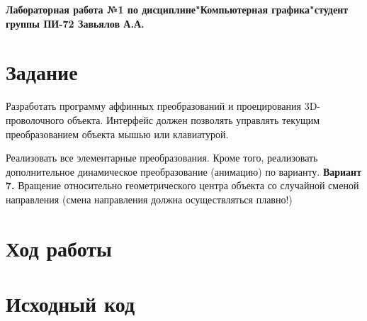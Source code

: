 \documentclass[a4paper,12pt]{article}
\begin{document}

\begin{center}
  \textbf{Лабораторная работа №1 по дисциплине\linebreak"Компьютерная графика"\linebreak{} студент группы ПИ-72 Завьялов А.А.}\\
\end{center}

\section{\normalsize{Задание}}
\begin{flushleft}
  Разработать программу аффинных преобразований и проецирования 3D-проволочного объекта. Интерфейс должен позволять управлять текущим преобразованием объекта мышью или клавиатурой.
\end{flushleft}

\begin{flushleft}
  Реализовать все элементарные преобразования. Кроме того, реализовать дополнительное динамическое преобразование (анимацию) по варианту.
  \linebreak\linebreak
  \textbf{Вариант 7.} Вращение относительно геометрического центра объекта со случайной сменой направления (смена направления должна осуществляться плавно!)
\end{flushleft}

\section{\normalsize{Ход работы}}
\begin{flushleft}
  
\end{flushleft}

\section{\normalsize{Исходный код}}
\inputminted[breaklines]{python}{../wireframe.py}
\end{document}
